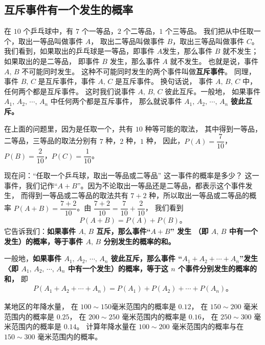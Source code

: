 \subsection{互斥事件\footnotemark 有一个发生的概率}\label{subsec:3-3}


在 $10$ 个乒乓球中，有 $7$ 个一等品，$2$ 个二等品，$1$ 个三等品。
我们把从中任取一个，取出一等品叫做事件 $A$， 取出二等品叫做事件 $B$，取出三等品叫做事件 $C$。
我们看到，如果取出的乒乓球是一等品，即事件 $A$发生，那么事件 $B$ 就不发生；
如果取出的是二等品， 即事件 $B$ 发生，那么事件 $A$ 就不发生。
也就是说，事件 $A,\, B$ 不可能同时发生。
这种不可能同时发生的两个事件叫做\textbf{互斥事件}。
同理，事件 $B,\, C$ 是互斥事件，事件 $A,\, C$ 是互斥事件。
换句话说， 事件 $A,\, B,\, C$ 中，任何两个都是互斥事件。
这时我们说事件 $A,\, B,\, C$ 彼此互斥。一般地，
如果事件 $A_1,\, A_2,\, \cdots,\, A_n$ 中任何两个都是互斥事件，
那么就说事件 $A_1,\, A_2,\, \cdots,\, A_n$ \textbf{彼此互斥。}


在上面的问题里，因为是任取一个，共有 $10$ 种等可能的取法，
其中得到一等品，二等品，三等品的取法分别有 $7$ 种，$2$ 种，$1$ 种，
因此，$P(A) = \dfrac{7}{10}$，$P(B) = \dfrac{2}{10}$，$P(C) = \dfrac{1}{10}$。


现在问：“任取一个乒乓球，取出一等品或二等品” 这一事件的概率是多少？
这一事件，我们记作“$A + B$”。因为不论取出一等品还是二等品，都表示这个事件发生，
而得到一等品或二等品的取法共有 $7 + 2$ 种，所以取出一等品或二等品的概率
$P(A+B) = \dfrac{7+2}{10}$。由 $\dfrac{7+2}{10} = \dfrac{7}{10} + \dfrac{2}{10}$，
我们看到
\begin{align}
    \boxed{P(A + B) = P(A) + P(B) \text{。}}  \tag{1} \label{eq:hu-chi}
\end{align}
它告诉我们：\textbf{如果事件 $A,\, B$ 互斥，那么事件“$A + B$” 发生
（即 $A,\, B$ 中有一个发生）的概率，等于事件 $A,\, B$ 分别发生的概率的和。}


一般地，\textbf{如果事件 $A_1,\, A_2,\, \cdots,\, A_n$ 彼此互斥，那么事件 “$A_1 + A_2 + \cdots + A_n$”发生
〈即 $A_1,\, A_2,\, \cdots,\, A_n$ 中有一个发生）的概率，等于这 $n$ 个事件分别发生的概率的和，} 即
\begin{align}
    P(A_1 + A_2 + \cdots + A_n) = P(A_1) + P(A_2) + \cdots + P(A_n) \text{。}  \tag{$1'$} \label{eq:hu-chi-ex}
\end{align}


\liti 某地区的年降水量， 在 $100 \sim 150$\footnotemark 毫米范围内的概率是 $0.12$，
在 $150 \sim 200$ 毫米范围内的概率是 $0.25$，
在 $200 \sim 250$ 毫米范围内的概率是 $0.16$，
在 $250 \sim 300$ 毫米范围内的概率是 $0.14$。
计算年降水量在 $100 \sim 200$ 毫米范围内的概率与在 $150 \sim 300$ 毫米范围内的概率。


